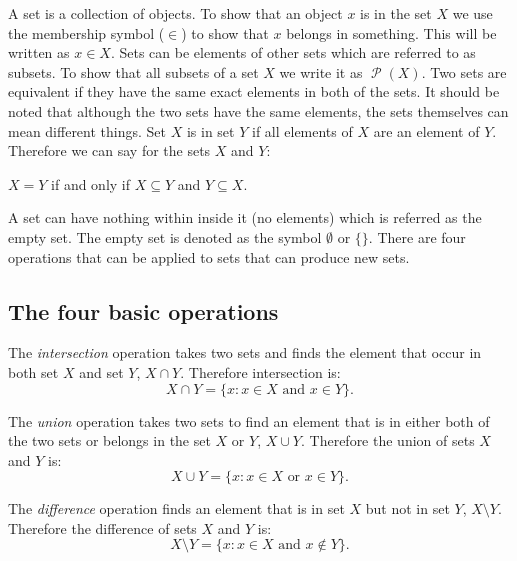 \documentclass[11pt,a4paper]{report}
\DeclareMathOperator{\power}{\mathcal{P}}
\begin{document}
A set is a collection of objects. To show that an object $x$ is in the set $X$ we use the membership symbol ($\in$) to show that $x$ belongs in something. This will be written as $x \in X$. Sets can be elements of other sets which are referred to as subsets. To show that all subsets of a set $X$ we write it as $\power(X)$. Two sets are equivalent if they have the same exact elements in both of the sets. It should be noted that although the two sets have the same elements, the sets themselves can mean different things. Set $X$ is in set $Y$ if all elements of $X$ are an element of $Y$.
Therefore we can say for the sets $X$ and $Y$:
\begin{center}
  $X=Y$ if and only if $X \subseteq Y$ and $Y \subseteq X$.
\end{center}
A set can have nothing within inside it (no elements) which is referred as the empty set. The empty set is denoted as the symbol $\emptyset$ or $\{\}$. There are four operations that can be applied to sets that can produce new sets.

\subsection{The four basic operations}
\label{sec:fourbasop}

The \emph{intersection} operation takes two sets and finds the element that occur in both set $X$ and set $Y$, $X \cap Y$. Therefore intersection is:
\begin{displaymath}
  X \cap Y = \{x : x \in X  \text{ and } x \in Y\}.
\end{displaymath}

The \emph{union} operation takes two sets to find an element that is in either both of the two sets or belongs in the set $X$ or $Y$, $X \cup Y$. Therefore the union of sets $X$ and $Y$ is:
\begin{displaymath}
  X \cup Y = \{x : x \in X  \text{ or } x \in Y\}.
\end{displaymath}

The \emph{difference} operation finds an element that is in set $X$ but not in set $Y$, $X \setminus Y$. Therefore the difference of sets $X$ and $Y$ is:
\begin{displaymath}
  X \setminus Y = \{x : x \in X  \text{ and } x \notin Y\}.
\end{displaymath}
\end{document}
